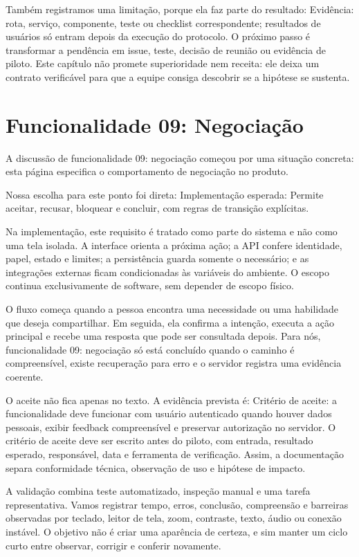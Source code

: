 \documentclass[12pt,oneside,a4paper,article]{abntex2}
\begin{document}
Também registramos uma limitação, porque ela faz parte do resultado: Evidência: rota, serviço, componente, teste ou checklist correspondente; resultados de usuários só entram depois da execução do protocolo. O próximo passo é transformar a pendência em issue, teste, decisão de reunião ou evidência de piloto. Este capítulo não promete superioridade nem receita: ele deixa um contrato verificável para que a equipe consiga descobrir se a hipótese se sustenta.

\section{Funcionalidade 09: Negociação}
A discussão de funcionalidade 09: negociação começou por uma situação concreta: esta página especifica o comportamento de negociação no produto.

Nossa escolha para este ponto foi direta: Implementação esperada: Permite aceitar, recusar, bloquear e concluir, com regras de transição explícitas.

Na implementação, este requisito é tratado como parte do sistema e não como uma tela isolada. A interface orienta a próxima ação; a API confere identidade, papel, estado e limites; a persistência guarda somente o necessário; e as integrações externas ficam condicionadas às variáveis do ambiente. O escopo continua exclusivamente de software, sem depender de escopo físico.

O fluxo começa quando a pessoa encontra uma necessidade ou uma habilidade que deseja compartilhar. Em seguida, ela confirma a intenção, executa a ação principal e recebe uma resposta que pode ser consultada depois. Para nós, funcionalidade 09: negociação só está concluído quando o caminho é compreensível, existe recuperação para erro e o servidor registra uma evidência coerente.

O aceite não fica apenas no texto. A evidência prevista é: Critério de aceite: a funcionalidade deve funcionar com usuário autenticado quando houver dados pessoais, exibir feedback compreensível e preservar autorização no servidor. O critério de aceite deve ser escrito antes do piloto, com entrada, resultado esperado, responsável, data e ferramenta de verificação. Assim, a documentação separa conformidade técnica, observação de uso e hipótese de impacto.

A validação combina teste automatizado, inspeção manual e uma tarefa representativa. Vamos registrar tempo, erros, conclusão, compreensão e barreiras observadas por teclado, leitor de tela, zoom, contraste, texto, áudio ou conexão instável. O objetivo não é criar uma aparência de certeza, e sim manter um ciclo curto entre observar, corrigir e conferir novamente.
\end{document}
